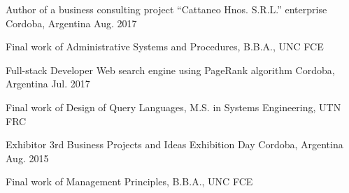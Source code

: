 \begin{cventries}
  \cventry
    {Author of a business consulting project} %
    {“Cattaneo Hnos. S.R.L.” enterprise} %
    {Cordoba, Argentina} %
    {Aug. 2017} %
    {
      \begin{cvitems} %
        \item {Final work of Administrative Systems and Procedures, B.B.A., UNC FCE}
      \end{cvitems}    
    }

  \cventry
    {Full-stack Developer} %
    {Web search engine using PageRank algorithm} %
    {Cordoba, Argentina} %
    {Jul. 2017} %
    {
      \begin{cvitems} %
        \item {Final work of Design of Query Languages, M.S. in Systems Engineering, UTN FRC}
      \end{cvitems}    
    }

  \cventry
    {Exhibitor} %
    {3rd Business Projects and Ideas Exhibition Day} %
    {Cordoba, Argentina} %
    {Aug. 2015} %
    {
      \begin{cvitems} %
        \item {Final work of Management Principles, B.B.A., UNC FCE}
      \end{cvitems}    
    }

\end{cventries}
